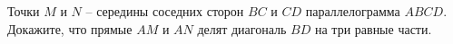 \begin{ex}
	\begin{condition}
		Точки \( M  \) и \( N \) – середины соседних сторон \( BC  \) и \( CD  \) параллелограмма \( ABCD \). Докажите, что прямые \( AM  \) и \( AN  \) делят диагональ \( BD  \) на три равные части.
	\end{condition}
\end{ex}